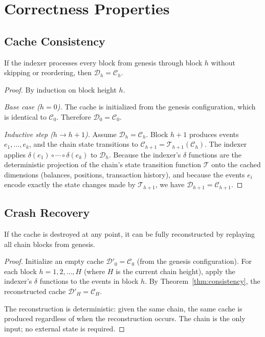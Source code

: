 \section{Correctness Properties}

\label{sec:correctness}

\subsection{Cache Consistency}

\begin{theorem}
\label{thm:consistency}
If the indexer processes every block from genesis through block $h$
without skipping or reordering, then $\mathcal{D}_h = \mathcal{C}_h$.
\end{theorem}

\begin{proof}
By induction on block height $h$.

\emph{Base case ($h = 0$).}  The cache is initialized from the genesis
configuration, which is identical to $\mathcal{C}_0$.  Therefore
$\mathcal{D}_0 = \mathcal{C}_0$.

\emph{Inductive step ($h \to h+1$).}  Assume
$\mathcal{D}_h = \mathcal{C}_h$.  Block $h+1$ produces events
$e_1, \ldots, e_k$, and the chain state transitions to
$\mathcal{C}_{h+1} = \mathcal{T}_{h+1}(\mathcal{C}_h)$.  The indexer
applies $\delta(e_1) \circ \cdots \circ \delta(e_k)$ to
$\mathcal{D}_h$.  Because the indexer's $\delta$ functions are the
deterministic projection of the chain's state transition function
$\mathcal{T}$ onto the cached dimensions (balances, positions,
transaction history), and because the events $e_i$ encode exactly the
state changes made by $\mathcal{T}_{h+1}$, we have
$\mathcal{D}_{h+1} = \mathcal{C}_{h+1}$.
\end{proof}

\subsection{Crash Recovery}

\begin{theorem}
\label{thm:recovery}
If the cache is destroyed at any point, it can be fully reconstructed
by replaying all chain blocks from genesis.
\end{theorem}

\begin{proof}
Initialize an empty cache $\mathcal{D}'_0 = \mathcal{C}_0$ (from the
genesis configuration).  For each block $h = 1, 2, \ldots, H$ (where
$H$ is the current chain height), apply the indexer's $\delta$
functions to the events in block $h$.  By
Theorem~\ref{thm:consistency}, the reconstructed cache
$\mathcal{D}'_H = \mathcal{C}_H$.

The reconstruction is deterministic: given the same chain, the same
cache is produced regardless of when the reconstruction occurs.  The
chain is the only input; no external state is required.
\end{proof}

